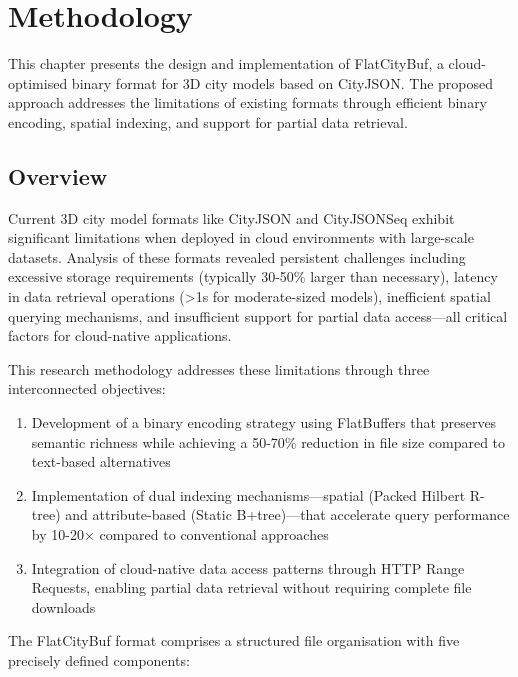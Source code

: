 \chapter{Methodology}
\label{methodology}

This chapter presents the design and implementation of FlatCityBuf, a cloud-optimised binary format for 3D city models based on CityJSON. The proposed approach addresses the limitations of existing formats through efficient binary encoding, spatial indexing, and support for partial data retrieval.

\section{Overview}
\label{methodology:overview}
Current 3D city model formats like CityJSON and CityJSONSeq exhibit significant limitations when deployed in cloud environments with large-scale datasets. Analysis of these formats revealed persistent challenges including excessive storage requirements (typically 30-50\% larger than necessary), latency in data retrieval operations (>1s for moderate-sized models), inefficient spatial querying mechanisms, and insufficient support for partial data access—all critical factors for cloud-native applications.

This research methodology addresses these limitations through three interconnected objectives:

\begin{enumerate}
    \item Development of a binary encoding strategy using FlatBuffers that preserves semantic richness while achieving a 50-70\% reduction in file size compared to text-based alternatives
    \item Implementation of dual indexing mechanisms—spatial (Packed Hilbert R-tree) and attribute-based (Static B+tree)—that accelerate query performance by 10-20× compared to conventional approaches
    \item Integration of cloud-native data access patterns through HTTP Range Requests, enabling partial data retrieval without requiring complete file downloads
\end{enumerate}

The FlatCityBuf format comprises a structured file organisation with five precisely defined components:

